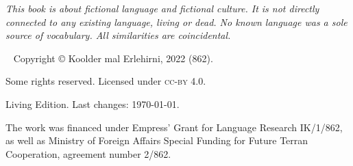\begin{fullwidth}

    \emph{This book is about fictional language and fictional culture. It is not
        directly connected to any existing language, living or dead. No known language
        was a sole source of vocabulary. All similarities are coincidental.}

    ~\vfill
    \thispagestyle{empty}
    \setlength{\parindent}{0pt}
    \setlength{\parskip}{\baselineskip}
    Copyright © Koolder mal Erlehirni, 2022 (862).

    \bigskip

    Some rights reserved. Licensed under \textsc{cc-by} 4.0.

    Living Edition. Last changes: \today{}.

    \medskip

    The work was financed under Empress' Grant for Language Research IK/1/862,
    as well as Ministry of Foreign Affairs Special Funding for Future Terran
    Cooperation, agreement number 2/862.

\end{fullwidth}